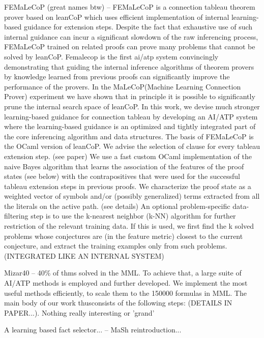 \documentclass{article}
\begin{document}
FEMaLeCoP (great names btw) \cite{femalecop} -- FEMaLeCoP is a connection
tableau theorem prover based on leanCoP which uses efficient implementation of
internal learning-based guidance for extension steps. Despite the fact that
exhaustive use of such internal guidance can incur a significant slowdown of
the raw inferencing process, FEMaLeCoP trained on related proofs can prove many
problems that cannot be solved by leanCoP. Femalecop is the first ai/atp system
convincingly demonstrating that guiding the internal inference algorithms of
theorem provers by knowledge learned from previous proofs can significantly
improve the performance of the provers.  In the MaLeCoP(Machine Learning
Connection Prover) experiment we have shown that in principle it is possible to
significantly prune the internal search space of leanCoP. In this work, we
devise much stronger learning-based guidance for connection tableau by
developing an AI/ATP system where the learning-based guidance is an optimized
and tightly integrated part of the core inferencing algorithm and data
structures. The basis of FEMaLeCoP is the OCaml version of leanCoP. We advise
the selection of clause for every tableau extension step. (see paper) We use
a fast custom OCaml implementation of the naive Bayes algorithm that learns the
association of the features of the proof states (see below) with the
contrapositives that were used for the successful tableau extension steps in
previous proofs. We characterize the proof state as a weighted vector of
symbols and/or (possibly generalized) terms extracted from all the literals on
the active path. (see details) An optional problem-specific data-filtering step
is to use the k-nearest neighbor (k-NN) algorithm for further restriction of
the relevant training data. If this is used, we first find the k solved
problems whose conjectures are (in the feature metric) closest to the current
conjecture, and extract the training examples only from such problems.
(INTEGRATED LIKE AN INTERNAL SYSTEM)

Mizar40 \cite{Mizar40} -- 40\% of thms solved in the MML. To achieve that,
a large suite of AI/ATP methods is employed and further developed. We implement
the most useful methods efficiently, to scale them to the 150000 formulas in
MML. The main body of our work thusconsists of the following steps: (DETAILS IN
PAPER...).  Nothing really interesting or 'grand'

A learning based fact selector... \cite{LearnBasedFactSelIsabel} -- MaSh
reintroduction...
\end{document}
